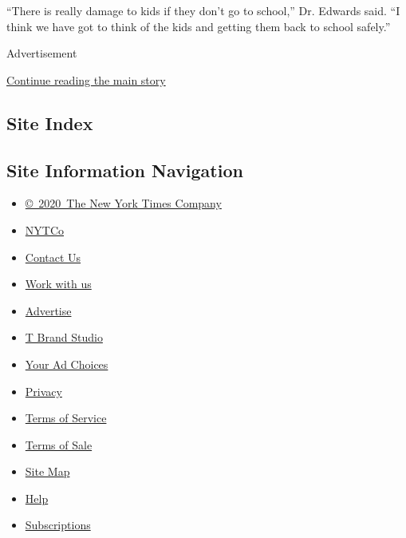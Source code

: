 ``There is really damage to kids if they don't go to school,'' Dr.
Edwards said. ``I think we have got to think of the kids and getting
them back to school safely.''

Advertisement

\protect\hyperlink{after-bottom}{Continue reading the main story}

\hypertarget{site-index}{%
\subsection{Site Index}\label{site-index}}

\hypertarget{site-information-navigation}{%
\subsection{Site Information
Navigation}\label{site-information-navigation}}

\begin{itemize}
\tightlist
\item
  \href{https://help.nytimes.com/hc/en-us/articles/115014792127-Copyright-notice}{©~2020~The
  New York Times Company}
\end{itemize}

\begin{itemize}
\tightlist
\item
  \href{https://www.nytco.com/}{NYTCo}
\item
  \href{https://help.nytimes.com/hc/en-us/articles/115015385887-Contact-Us}{Contact
  Us}
\item
  \href{https://www.nytco.com/careers/}{Work with us}
\item
  \href{https://nytmediakit.com/}{Advertise}
\item
  \href{http://www.tbrandstudio.com/}{T Brand Studio}
\item
  \href{https://www.nytimes.com/privacy/cookie-policy\#how-do-i-manage-trackers}{Your
  Ad Choices}
\item
  \href{https://www.nytimes.com/privacy}{Privacy}
\item
  \href{https://help.nytimes.com/hc/en-us/articles/115014893428-Terms-of-service}{Terms
  of Service}
\item
  \href{https://help.nytimes.com/hc/en-us/articles/115014893968-Terms-of-sale}{Terms
  of Sale}
\item
  \href{https://spiderbites.nytimes.com}{Site Map}
\item
  \href{https://help.nytimes.com/hc/en-us}{Help}
\item
  \href{https://www.nytimes.com/subscription?campaignId=37WXW}{Subscriptions}
\end{itemize}

